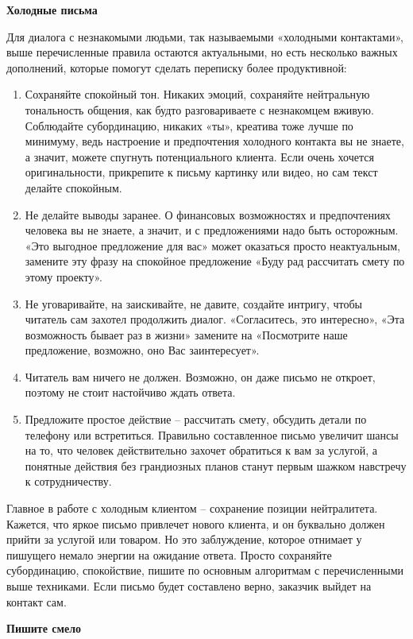 \textbf{Холодные письма}

Для диалога с незнакомыми людьми, так называемыми «холодными контактами», выше перечисленные правила остаются актуальными, но есть несколько важных дополнений, которые помогут сделать переписку более продуктивной:
\begin{enumerate}
    \item Сохраняйте спокойный тон. Никаких эмоций, сохраняйте нейтральную тональность общения, как будто разговариваете с незнакомцем вживую. Соблюдайте субординацию, никаких «ты», креатива тоже лучше по минимуму, ведь настроение и предпочтения холодного контакта вы не знаете, а значит, можете спугнуть потенциального клиента. Если очень хочется оригинальности, прикрепите к письму картинку или видео, но сам текст делайте спокойным.
    \item Не делайте выводы заранее. О финансовых возможностях и предпочтениях человека вы не знаете, а значит, и с предложениями надо быть осторожным. «Это выгодное предложение для вас» может оказаться просто неактуальным, замените эту фразу на спокойное предложение «Буду рад рассчитать смету по этому проекту».
    \item Не уговаривайте, на заискивайте, не давите, создайте интригу, чтобы читатель сам захотел продолжить диалог. «Согласитесь, это интересно», «Эта возможность бывает раз в жизни» замените на «Посмотрите наше предложение, возможно, оно Вас заинтересует».
    \item Читатель вам ничего не должен. Возможно, он даже письмо не откроет, поэтому не стоит настойчиво ждать ответа.
    \item Предложите простое действие – рассчитать смету, обсудить детали по телефону или встретиться. Правильно составленное письмо увеличит шансы на то, что человек действительно захочет обратиться к вам за услугой, а понятные действия без грандиозных планов станут первым шажком навстречу к сотрудничеству.
\end{enumerate}

Главное в работе с холодным клиентом – сохранение позиции нейтралитета. Кажется, что яркое письмо привлечет нового клиента, и он буквально должен прийти за услугой или товаром. Но это заблуждение, которое отнимает у пишущего немало энергии на ожидание ответа. Просто сохраняйте субординацию, спокойствие, пишите по основным алгоритмам с перечисленными выше техниками. Если письмо будет составлено верно, заказчик выйдет на контакт сам.

\textbf{Пишите смело}

